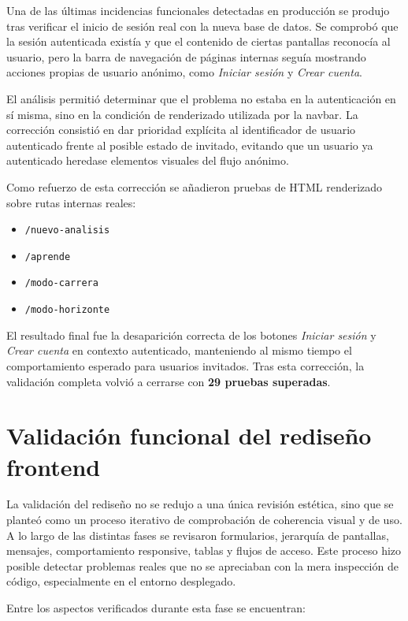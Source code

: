 Una de las últimas incidencias funcionales detectadas en producción se produjo tras verificar el inicio de sesión real con la nueva base de datos. Se comprobó que la sesión autenticada existía y que el contenido de ciertas pantallas reconocía al usuario, pero la barra de navegación de páginas internas seguía mostrando acciones propias de usuario anónimo, como \textit{Iniciar sesión} y \textit{Crear cuenta}.

El análisis permitió determinar que el problema no estaba en la autenticación en sí misma, sino en la condición de renderizado utilizada por la navbar. La corrección consistió en dar prioridad explícita al identificador de usuario autenticado frente al posible estado de invitado, evitando que un usuario ya autenticado heredase elementos visuales del flujo anónimo.

Como refuerzo de esta corrección se añadieron pruebas de HTML renderizado sobre rutas internas reales:

\begin{itemize}
    \item \texttt{/nuevo-analisis}
    \item \texttt{/aprende}
    \item \texttt{/modo-carrera}
    \item \texttt{/modo-horizonte}
\end{itemize}

El resultado final fue la desaparición correcta de los botones \textit{Iniciar sesión} y \textit{Crear cuenta} en contexto autenticado, manteniendo al mismo tiempo el comportamiento esperado para usuarios invitados. Tras esta corrección, la validación completa volvió a cerrarse con \textbf{29 pruebas superadas}.

\section{Validación funcional del rediseño frontend}

La validación del rediseño no se redujo a una única revisión estética, sino que se planteó como un proceso iterativo de comprobación de coherencia visual y de uso. A lo largo de las distintas fases se revisaron formularios, jerarquía de pantallas, mensajes, comportamiento responsive, tablas y flujos de acceso. Este proceso hizo posible detectar problemas reales que no se apreciaban con la mera inspección de código, especialmente en el entorno desplegado.

Entre los aspectos verificados durante esta fase se encuentran:

